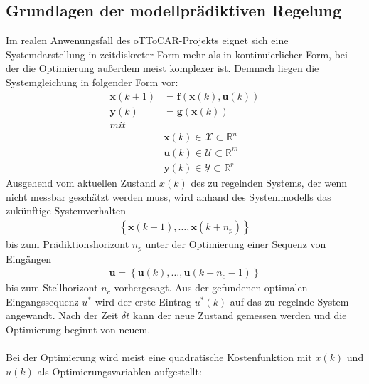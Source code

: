 \subsection{Grundlagen der modellprädiktiven Regelung}
Im realen Anwenungsfall des oTToCAR-Projekts eignet sich eine Systemdarstellung in zeitdiskreter Form mehr als in kontinuierlicher Form, bei der die Optimierung außerdem meist komplexer ist. Demnach liegen die Systemgleichung in folgender Form vor:
\begin{align}
  \boldsymbol{x}(k+1)&=\boldsymbol{f}\left ( \boldsymbol{x}(k), \boldsymbol{u}(k) \right )\\
	\boldsymbol{y}(k)&=\boldsymbol{g}\left ( \boldsymbol{x}(k) \right )\\
	mit\\
	&\boldsymbol{x}(k) \in \mathcal{X}\subset\mathbb{R}^n\\
	&\boldsymbol{u}(k) \in \mathcal{U}\subset\mathbb{R}^m\\
	&\boldsymbol{y}(k) \in \mathcal{Y}\subset\mathbb{R}^r
\end{align}
Ausgehend vom aktuellen Zustand $x(k)$ des zu regelnden Systems, der wenn nicht messbar geschätzt werden muss, wird anhand des Systemmodells das zukünftige Systemverhalten
\begin{align}
  \left\{ \boldsymbol{x}(k+1),\dots,\boldsymbol{x}(k+n_p)\right\}
\end{align}
bis zum Prädiktionshorizont $n_p$ unter der Optimierung einer Sequenz von Eingängen
\begin{align}
  \boldsymbol{u}=\left\{ \boldsymbol{u}(k),\dots,\boldsymbol{u}(k+n_c-1)\right\}
\end{align}
bis zum Stellhorizont $n_c$ vorhergesagt. Aus der gefundenen optimalen Eingangssequenz $u^*$ wird der erste Eintrag $u^*(k)$ auf das zu regelnde System angewandt. Nach der Zeit $\delta t$ kann der neue Zustand gemessen werden und die Optimierung beginnt von neuem.\\ \\
Bei der Optimierung wird meist eine quadratische Kostenfunktion mit $x(k)$ und $u(k)$ als Optimierungsvariablen aufgestellt:
